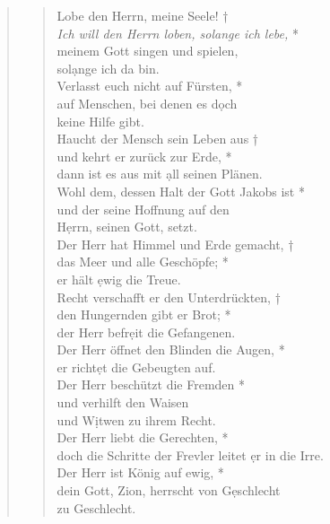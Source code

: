 \begin{quote}

\begin{verse}
 Lobe den Herrn, meine Seele! †\\
\textit{Ich will den Herrn loben, solange ich lebe,} *\\
meinem Gott singen und spielen,\\ sol\d ange ich da bin. \\
\vin Verlasst euch nicht auf Fürsten, *\\
\vin auf Menschen, bei denen es d\d och \\ \vin keine Hilfe gibt. \\
Haucht der Mensch sein Leben aus †\\
und kehrt er zurück zur Erde, * \\
dann ist es aus mit \d all seinen Plänen. \\
\vin Wohl dem, dessen Halt  der Gott Jakobs ist *\\
\vin und der seine Hoffnung auf den\\ \vin H\d errn, seinen Gott, setzt. \\
Der Herr hat Himmel und Erde gemacht, †\\
das Meer und alle Geschöpfe; * \\
er hält \d ewig die Treue.\\
\vin Recht verschafft er den Unterdrückten, †\\
\vin den Hungernden gibt er Brot; *\\
\vin  der Herr befr\d eit die Gefangenen. \\
Der Herr öffnet den Blinden die Augen, *\\
er richt\d et die Gebeugten auf. \\
\vin Der Herr beschützt die Fremden *\\
\vin und verhilft den Waisen \\ \vin und W\d itwen zu ihrem Recht. \\
Der Herr liebt die Gerechten, * \\
doch die Schritte der Frevler leitet \d er in die Irre.\\
\vin Der Herr ist König auf ewig, *\\
\vin dein Gott, Zion, herrscht von G\d eschlecht \\ \vin zu Geschlecht.\\

\end{verse}

\end{quote}
\vspace{0.3cm}

